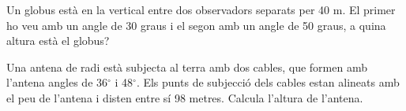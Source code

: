 \begin{mylist}
	
	
	\exer
	Un globus està en la vertical entre dos observadors separats per 40 m.
	El primer ho veu amb un angle de 30 graus i el segon amb un angle de
	50 graus, a quina altura està el globus?
	
	
	
	
	\exer
	Una antena de radi està subjecta al terra amb dos cables, que formen
	amb l'antena angles de 36${}^\circ$ i 48${}^\circ$. Els punts de subjecció dels cables	estan alineats amb el peu de l'antena i disten entre sí 98 metres.
	Calcula l'altura de l'antena.
	
	

\end{mylist}
